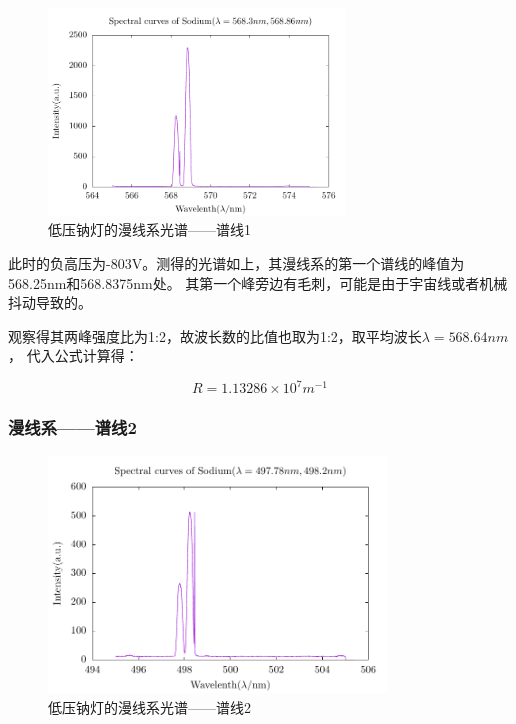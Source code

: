 \documentclass[a4paper,UTF8]{ctexart}
\begin{document}
\begin{figure}[H]
    \centering
    \begin{minipage}[b]{0.9\textwidth}
        \centering
        \includegraphics[width=0.7\textwidth]{./na_2.pdf}
        \caption{低压钠灯的漫线系光谱——谱线1}
    \end{minipage}
\end{figure}

此时的负高压为-803V。测得的光谱如上，其漫线系的第一个谱线的峰值为568.25nm和568.8375nm处。
其第一个峰旁边有毛刺，可能是由于宇宙线或者机械抖动导致的。

观察得其两峰强度比为1:2，故波长数的比值也取为1:2，取平均波长$\lambda = 568.64nm$，
代入公式计算得：

\begin{equation}
    R = 1.13286 \times 10^7 m^{-1}
\end{equation}

\subsubsection{漫线系——谱线2}

\begin{figure}[H]
    \centering
    \begin{minipage}[b]{0.9\textwidth}
        \centering
        \includegraphics[width=0.8\textwidth]{./na_3.pdf}
        \caption{低压钠灯的漫线系光谱——谱线2}
    \end{minipage}
\end{figure}
\end{document}
